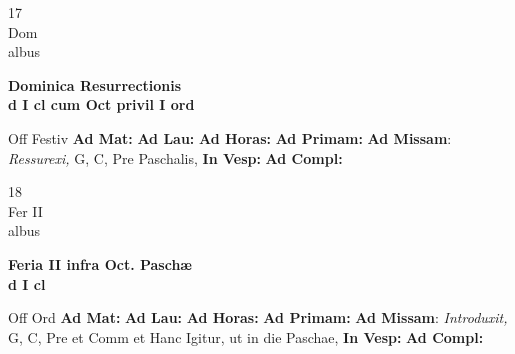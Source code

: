 \documentclass[10pt, openany]{book}
\begin{document}
    \begin{center}
        \begin{minipage}{3.5in}
            \vspace{2em}
            \begin{minipage}{0.5in}
                {\Huge 17} \\
                {\normalsize Dom} \\
                {\normalsize albus}
            \end{minipage}
            \begin{minipage}{3.0in}
                \textbf{ \large Dominica Resurrectionis \\
                \textnormal{\normalsize d I cl cum Oct privil I ord}} \\ 
            \end{minipage}
            \begin{justify}Off Festiv
                \textbf{Ad Mat: }
                \textbf{Ad Lau: }
                \textbf{Ad Horas: }
                \textbf{Ad Primam: }\textbf{Ad Missam}: \textit{Ressurexi,} G, C, Pre Paschalis,  
                \textbf{In Vesp: }
                \textbf{Ad Compl: }
            \end{justify}
        \end{minipage}
    \end{center}

    \begin{center}
        \begin{minipage}{3.5in}
            \vspace{2em}
            \begin{minipage}{0.5in}
                {\Huge 18} \\
                {\normalsize Fer II} \\
                {\normalsize albus}
            \end{minipage}
            \begin{minipage}{3.0in}
                \textbf{ \large Feria II infra Oct. Paschæ \\
                \textnormal{\normalsize d I cl}} \\ 
            \end{minipage}
            \begin{justify}Off Ord
                \textbf{Ad Mat: }
                \textbf{Ad Lau: }
                \textbf{Ad Horas: }
                \textbf{Ad Primam: }\textbf{Ad Missam}: \textit{Introduxit,} G, C, Pre et Comm et Hanc Igitur, ut in die Paschae,  
                \textbf{In Vesp: }
                \textbf{Ad Compl: }
            \end{justify}
        \end{minipage}
    \end{center}
\end{document}
